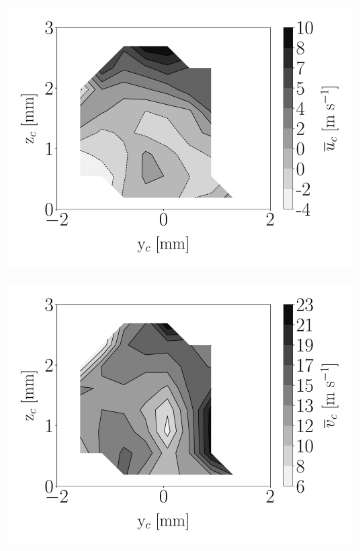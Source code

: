 \begin{figure}[h!]
\begin{subfigure}[b]{0.3\textwidth}
	\centering
   \includegraphics[scale=\scaleSLIBIMER]{./part3_applications/figures_ch8_resolved/injectors_SLI/dx15_xD06p67_ux_mean_map}
\end{subfigure}
   \hspace{0.17in}
\begin{subfigure}[b]{0.3\textwidth}
	\centering
   \includegraphics[scale=\scaleSLIBIMER]{./part3_applications/figures_ch8_resolved/injectors_SLI/dx15_xD06p67_uy_mean_map}
\end{subfigure}
   \hspace{0.17in}

\end{figure}
